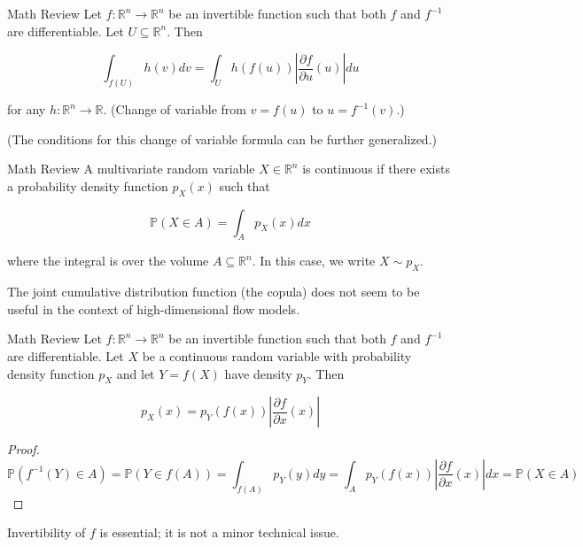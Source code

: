 \begin{frame}[allowframebreaks]

\begin{myconceptblock}{10.15}{Math Review}
    Let $f: \mathbb{R}^{n} \rightarrow \mathbb{R}^{n}$ be an invertible function such that both $f$ and $f^{-1}$ are differentiable. Let $U \subseteq \mathbb{R}^{n}$. Then

    $$
    \int_{f(U)} h(v) d v=\int_{U} h(f(u))\left|\frac{\partial f}{\partial u}(u)\right| d u
    $$

    for any $h: \mathbb{R}^{n} \rightarrow \mathbb{R}$. (Change of variable from $v=f(u)$ to $u=f^{-1}(v)$.)

    (The conditions for this change of variable formula can be further generalized.)
\end{myconceptblock}

\end{frame}

\begin{frame}[allowframebreaks]

\begin{myconceptblock}{10.16}{Math Review}
    A multivariate random variable $X \in \mathbb{R}^{n}$ is continuous if there exists a probability density function $p_{X}(x)$ such that

    $$
    \mathbb{P}(X \in A)=\int_{A} p_{X}(x) d x
    $$

    where the integral is over the volume $A \subseteq \mathbb{R}^{n}$. In this case, we write $X \sim p_{X}$.

    The joint cumulative distribution function (the copula) does not seem to be useful in the context of high-dimensional flow models.
\end{myconceptblock}

\end{frame}

\begin{frame}[allowframebreaks]

\begin{myconceptblock}{10.17}{Math Review}
    Let $f: \mathbb{R}^{n} \rightarrow \mathbb{R}^{n}$ be an invertible function such that both $f$ and $f^{-1}$ are differentiable. Let $X$ be a continuous random variable with probability density function $p_{X}$ and let $Y=f(X)$ have density $p_{Y}$. Then

    $$
    p_{X}(x)=p_{Y}(f(x))\left|\frac{\partial f}{\partial x}(x)\right|
    $$

    \begin{proof}
        $$
        \mathbb{P}\left(f^{-1}(Y) \in A\right)=\mathbb{P}(Y \in f(A))=\int_{f(A)} p_{Y}(y) d y=\int_{A} p_{Y}(f(x))\left|\frac{\partial f}{\partial x}(x)\right| d x=\mathbb{P}(X \in A)
        $$
    \end{proof}

    Invertibility of $f$ is essential; it is not a minor technical issue.
\end{myconceptblock}

\end{frame}

